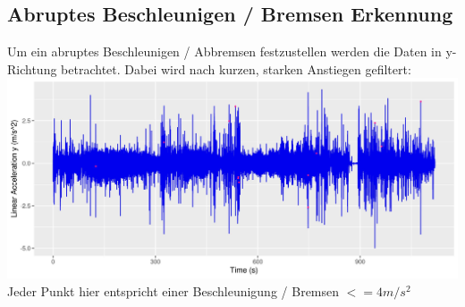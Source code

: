 \documentclass{article}
\begin{document}
\begin{multicols*}{3}
   \subsection*{Abruptes Beschleunigen / Bremsen Erkennung}
   Um ein abruptes Beschleunigen / Abbremsen festzustellen werden die Daten in y-Richtung betrachtet. Dabei wird nach kurzen, starken Anstiegen gefiltert:
   \includegraphics[width=\linewidth]{../images/Calculations_cell_8_output_0}
   Jeder Punkt hier entspricht einer Beschleunigung / Bremsen  $<=4m/s^{2}$

\end{multicols*}
\end{document}
